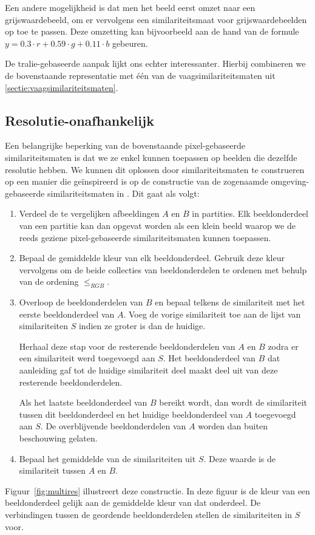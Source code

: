 Een andere mogelijkheid is dat men het beeld eerst omzet naar een grijswaardebeeld, om er 
vervolgens een similariteitsmaat voor grijswaardebeelden op toe te passen. Deze omzetting kan 
bijvoorbeeld aan de hand van de formule $y = 0.3 \cdot r + 0.59 \cdot g + 0.11 \cdot b$ gebeuren.

De tralie-gebaseerde aanpak lijkt ons echter interessanter. Hierbij combineren we
de bovenstaande representatie met \'e\'en van de vaagsimilariteitsmaten uit 
\ref{sectie:vaagsimilariteitsmaten}. 

\subsection{Resolutie-onafhankelijk}

Een belangrijke beperking van de bovenstaande pixel-gebaseerde similariteitsmaten is dat we
ze enkel kunnen toepassen op beelden die dezelfde resolutie hebben. We kunnen dit oplossen
door similariteitsmaten te construeren op een manier die ge\"inspireerd is op de constructie
van de zogenaamde omgeving-gebaseerde similariteitsmaten in \cite{vanderweken:similariteitsmaten}. 
Dit gaat als volgt:
\begin{enumerate}
\item Verdeel de te vergelijken afbeeldingen $A$ en $B$
in partities. Elk beeldonderdeel van een partitie kan dan opgevat worden als een klein beeld
waarop we de reeds geziene pixel-gebaseerde similariteitsmaten kunnen toepassen.
\item Bepaal de gemiddelde kleur van elk beeldonderdeel. Gebruik deze kleur vervolgens
om de beide collecties van beeldonderdelen te ordenen met behulp van de ordening $\leq_{RGB}$.
\item Overloop de beeldonderdelen van $B$ en bepaal telkens de similariteit met het eerste 
beeldonderdeel van $A$. Voeg de vorige similariteit toe aan de lijst van similariteiten $S$
indien ze groter is dan de huidige. 

Herhaal deze stap voor de resterende
beeldonderdelen van $A$ en $B$ zodra er een similariteit werd toegevoegd aan $S$. Het 
beeldonderdeel van $B$ dat aanleiding gaf tot de huidige similariteit deel maakt deel uit van
deze resterende beeldonderdelen.

Als het laatste beeldonderdeel van $B$ bereikt wordt, dan wordt de similariteit tussen dit
beeldonderdeel en het huidige beeldonderdeel van $A$ toegevoegd aan $S$. De overblijvende
beeldonderdelen van $A$ worden dan buiten beschouwing gelaten. 
\item Bepaal het gemiddelde van de similariteiten uit $S$. Deze waarde is de similariteit tussen
$A$ en $B$.
\end{enumerate}
Figuur~\ref{fig:multires} illustreert deze constructie. In deze figuur is de kleur van een
beeldonderdeel gelijk aan de gemiddelde kleur van dat onderdeel. De verbindingen tussen de
geordende beeldonderdelen stellen de similariteiten in $S$ voor.

